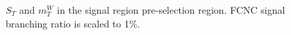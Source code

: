 \begin{figure}[h!]
\caption{$S_T$ and $m_T^W$ in the signal region pre-selection region.  FCNC signal branching ratio is scaled to 1\%.}
\label{fig:PreSelPlotsST}
\end{figure}

